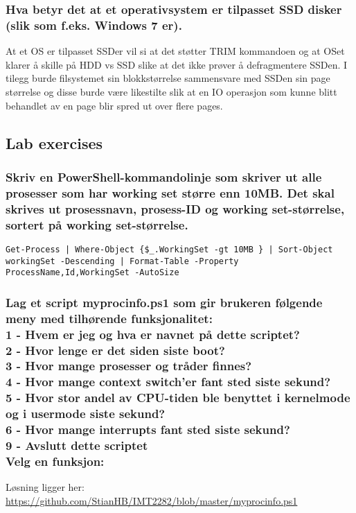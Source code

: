 \documentclass[9pt]{article}
\begin{document}
\subsubsection{Hva betyr det at et operativsystem er tilpasset SSD disker (slik som f.eks. Windows 7 er).}

At et OS er tilpasset SSDer vil si at det støtter TRIM kommandoen og at OSet klarer å skille på HDD vs SSD slike at det ikke prøver å defragmentere SSDen. I tilegg burde filsystemet sin blokkstørrelse sammensvare med SSDen sin page størrelse og disse burde være likestilte slik at en IO operasjon som kunne blitt behandlet av en page blir spred ut over flere pages.
\subsection{Lab exercises}
\subsubsection{Skriv en PowerShell-kommandolinje som skriver ut alle prosesser som har working set større enn 10MB. Det skal skrives ut prosessnavn, prosess-ID og working set-størrelse, sortert på working set-størrelse.}
\begin{lstlisting}[breaklines]
Get-Process | Where-Object {$_.WorkingSet -gt 10MB } | Sort-Object workingSet -Descending | Format-Table -Property ProcessName,Id,WorkingSet -AutoSize
\end{lstlisting}
\subsubsection{Lag et script myprocinfo.ps1 som gir brukeren følgende meny med tilhørende funksjonalitet: \\
1 - Hvem er jeg og hva er navnet på dette scriptet? \\
2 - Hvor lenge er det siden siste boot? \\
3 - Hvor mange prosesser og tråder finnes? \\
4 - Hvor mange context switch'er fant sted siste sekund? \\
5 - Hvor stor andel av CPU-tiden ble benyttet i kernelmode og i usermode siste sekund? \\
6 - Hvor mange interrupts fant sted siste sekund? \\
9 - Avslutt dette scriptet \\
Velg en funksjon:
}

Løsning ligger her: \\
\url{https://github.com/StianHB/IMT2282/blob/master/myprocinfo.ps1}
 
\end{document}
